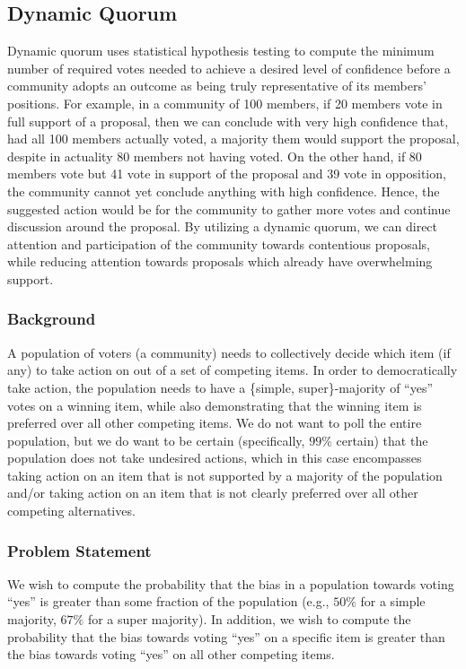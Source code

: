 \documentclass{sigchi}
\begin{document}
\subsection{Dynamic Quorum}


Dynamic quorum uses statistical hypothesis testing to compute the minimum number of required votes needed
to achieve a desired level of confidence before a community adopts an outcome as being truly representative of
its members' positions.
For example, in a community of 100 members, if 20 members vote in full support of a proposal, then we can conclude
with very high confidence that, had all 100 members actually voted, a majority them would support the proposal,
despite in actuality 80 members not having voted.
On the other hand, if 80 members vote but 41 vote in support of the proposal and 39 vote in opposition,
the community cannot yet conclude anything with high confidence.
Hence, the suggested action would be for the community to gather more votes and continue discussion around the proposal.
By utilizing a dynamic quorum, we can direct attention and participation of the community towards contentious proposals,
while reducing attention towards proposals which already have overwhelming support.

\subsubsection{Background}
A population of voters (a community) needs to collectively decide which item (if any) to take action on out of a set of competing items.
In order to democratically take action, the population needs to have a \{simple, super\}-majority of ``yes'' votes on a
winning item, while also demonstrating that the winning item is preferred over all other competing items.
We do not want to poll the entire population, but we do want to be certain (specifically, $99\%$ certain) that
the population does not take undesired actions, which in this case encompasses taking action on an item that is not
supported by a majority of the population and/or taking action on an item that is not clearly preferred over all
other competing alternatives.

\subsubsection{Problem Statement}
We wish to compute the probability that the bias in a population towards voting ``yes'' is greater than some
fraction of the population (e.g., $50\%$ for a simple majority, $67\%$ for a super majority).
In addition, we wish to compute the probability that the bias towards voting ``yes'' on a specific item is greater
than the bias towards voting ``yes'' on all other competing items.
\end{document}
